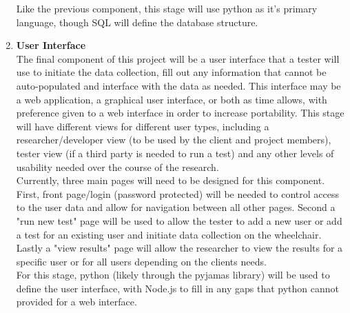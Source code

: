 \documentclass[onecolumn, draftclsnofoot,10pt, compsoc]{IEEEtran}
\begin{document}
\begin{enumerate}
	Like the previous component, this stage will use python as it's primary language, though SQL will define the database structure. \\ 
	\item \textbf{User Interface}\\
	The final component of this project will be a user interface that a tester will use to initiate the data collection, fill out any information that cannot be auto-populated and interface with the data as needed. This interface may be a web application, a graphical user interface, or both as time allows, with preference given to a web interface in order to increase portability. This stage will have different views for different user types, including a researcher/developer view (to be used by the client and project members), tester view (if a third party is needed to run a test) and any other levels of usability needed over the course of the research.\\
	Currently, three main pages will need to be designed for this component. First, front page/login (password protected) will be needed to control access to the user data and allow for navigation between all other pages. Second a "run new test" page will be used to allow the tester to add a new user or add a test for an existing user and initiate data collection on the wheelchair. Lastly a "view results" page will allow the researcher to view the results for a specific user or for all users depending on the clients needs. \\
	For this stage, python (likely through the pyjamas library) will be used to define the user interface, with Node.js to fill in any gaps that python cannot provided for a web interface.\\
	

\end{enumerate}
\end{document}
